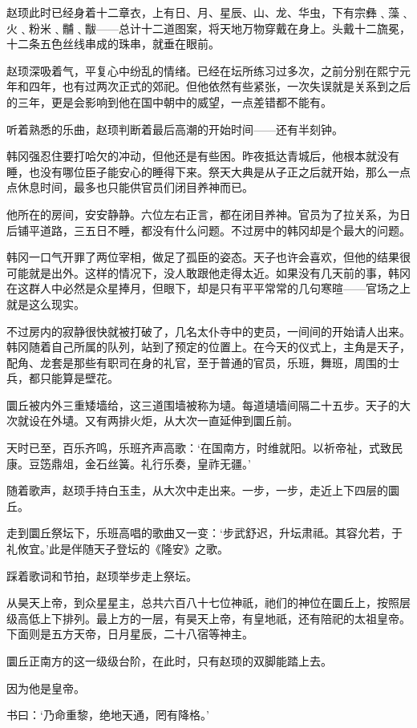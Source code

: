 赵顼此时已经身着十二章衣，上有日、月、星辰、山、龙、华虫，下有宗彝﹑藻﹑火﹑粉米﹑黼﹑黻——总计十二道图案，将天地万物穿戴在身上。头戴十二旒冕，十二条五色丝线串成的珠串，就垂在眼前。

赵顼深吸着气，平复心中纷乱的情绪。已经在坛所练习过多次，之前分别在熙宁元年和四年，也有过两次正式的郊祀。但他依然有些紧张，一次失误就是关系到之后的三年，更是会影响到他在国中朝中的威望，一点差错都不能有。

听着熟悉的乐曲，赵顼判断着最后高潮的开始时间——还有半刻钟。

韩冈强忍住要打哈欠的冲动，但他还是有些困。昨夜抵达青城后，他根本就没有睡，也没有哪位臣子能安心的睡得下来。祭天大典是从子正之后就开始，那么一点点休息时间，最多也只能供官员们闭目养神而已。

他所在的房间，安安静静。六位左右正言，都在闭目养神。官员为了拉关系，为日后铺平道路，三五日不睡，都没有什么问题。不过房中的韩冈却是个最大的问题。

韩冈一口气开罪了两位宰相，做足了孤臣的姿态。天子也许会喜欢，但他的结果很可能就是出外。这样的情况下，没人敢跟他走得太近。如果没有几天前的事，韩冈在这群人中必然是众星捧月，但眼下，却是只有平平常常的几句寒暄——官场之上就是这么现实。

不过房内的寂静很快就被打破了，几名太仆寺中的吏员，一间间的开始请人出来。韩冈随着自己所属的队列，站到了预定的位置上。在今天的仪式上，主角是天子，配角、龙套是那些有职司在身的礼官，至于普通的官员，乐班，舞班，周围的士兵，都只能算是壁花。

圜丘被内外三重矮墙给，这三道围墙被称为壝。每道壝墙间隔二十五步。天子的大次就设在外壝。又有两排火炬，从大次一直延伸到圜丘前。

天时已至，百乐齐鸣，乐班齐声高歌：‘在国南方，时维就阳。以祈帝祉，式致民康。豆笾鼎俎，金石丝簧。礼行乐奏，皇祚无疆。’

随着歌声，赵顼手持白玉圭，从大次中走出来。一步，一步，走近上下四层的圜丘。

走到圜丘祭坛下，乐班高唱的歌曲又一变：‘步武舒迟，升坛肃祗。其容允若，于礼攸宜。’此是伴随天子登坛的《隆安》之歌。

踩着歌词和节拍，赵顼举步走上祭坛。

从昊天上帝，到众星星主，总共六百八十七位神祇，祂们的神位在圜丘上，按照层级高低上下排列。最上方的一层，有昊天上帝，有皇地祇，还有陪祀的太祖皇帝。下面则是五方天帝，日月星辰，二十八宿等神主。

圜丘正南方的这一级级台阶，在此时，只有赵顼的双脚能踏上去。

因为他是皇帝。

书曰：‘乃命重黎，绝地天通，罔有降格。’

